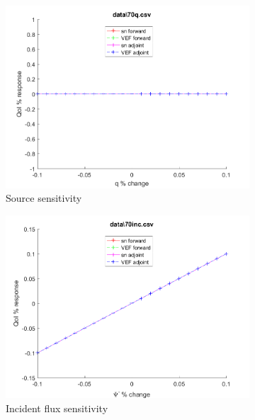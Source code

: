 \documentclass{article}
\begin{document}
\begin{figure}[H]
\label{Case70Sens}
\centering
\begin{subfigure}{.5\textwidth}
  \centering
  \includegraphics[width=.98\linewidth]{IanProposal/figures2/70qSens.png}
  \caption{Source sensitivity}
  \label{fig:sfig1}
\end{subfigure}%
\begin{subfigure}{.5\textwidth}
  \centering
  \includegraphics[width=.98\linewidth]{IanProposal/figures2/70incSens.png}
  \caption{Incident flux sensitivity}
  \label{fig:sfig4}
\end{subfigure}%
\\
\begin{subfigure}{.5\textwidth}
  \centering

\end{subfigure}
\end{figure}
\end{document}

